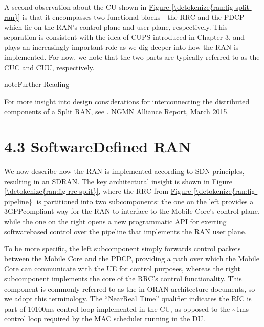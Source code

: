 \documentclass[a4paper,11pt,english]{sphinxmanual}
\begin{document}
\sphinxAtStartPar
A second observation about the CU shown in \hyperref[\detokenize{ran:fig-split-ran}]{Figure \ref{\detokenize{ran:fig-split-ran}}} is that it encompasses two functional blocks—the RRC
and the PDCP—which lie on the RAN’s control plane and user plane,
respectively. This separation is consistent with the idea of CUPS
introduced in Chapter 3, and plays an increasingly important role as
we dig deeper into how the RAN is implemented. For now, we note that
the two parts are typically referred to as the CU\sphinxhyphen{}C and CU\sphinxhyphen{}U,
respectively.

\label{\detokenize{ran:reading-backhaul}}
\begin{sphinxadmonition}{note}{Further Reading}

\sphinxAtStartPar
For more insight into design considerations for
interconnecting the distributed components of a Split RAN, see
.
NGMN Alliance Report, March 2015.
\end{sphinxadmonition}


\section{4.3 Software\sphinxhyphen{}Defined RAN}
\label{\detokenize{ran:software-defined-ran}}
\sphinxAtStartPar
We now describe how the RAN is implemented according to SDN
principles, resulting in an SD\sphinxhyphen{}RAN. The key architectural insight is
shown in \hyperref[\detokenize{ran:fig-rrc-split}]{Figure \ref{\detokenize{ran:fig-rrc-split}}}, where the RRC from
\hyperref[\detokenize{ran:fig-pipeline}]{Figure \ref{\detokenize{ran:fig-pipeline}}} is partitioned into two
sub\sphinxhyphen{}components: the one on the left provides a 3GPP\sphinxhyphen{}compliant way for
the RAN to interface to the Mobile Core’s control plane, while the one
on the right opens a new programmatic API for exerting software\sphinxhyphen{}based
control over the pipeline that implements the RAN user plane.

\sphinxAtStartPar
To be more specific, the left sub\sphinxhyphen{}component simply forwards control
packets between the Mobile Core and the PDCP, providing a path over
which the Mobile Core can communicate with the UE for control
purposes, whereas the right sub\sphinxhyphen{}component implements the core of the
RRC’s control functionality. This component is commonly referred to as
the  in O\sphinxhyphen{}RAN architecture
documents, so we adopt this terminology.  The “Near\sphinxhyphen{}Real Time”
qualifier indicates the RIC is part of 10\sphinxhyphen{}100ms control loop implemented
in the CU, as opposed to the \textasciitilde{}1ms control loop required by the MAC
scheduler running in the DU.
\end{document}
